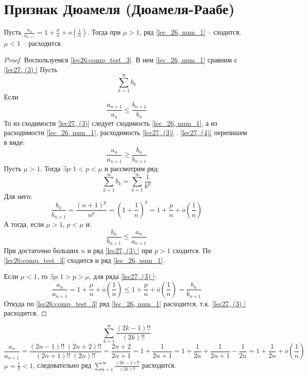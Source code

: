 \documentclass[../../main.tex]{subfiles}
\begin{document}
	\section{Признак Дюамеля (Дюамеля-Раабе)}
	
	\begin{thm}\label{lec27,duamele_raabe}
		Пусть $\frac{a_n}{a_{n+1}} = 1 + \frac{\mu}{n} + o\left( \frac{1}{n}\right) $. Тогда при $\mu > 1$, ряд \ref{lec_26, num_1} \--- сходится, $\mu < 1$ \--- расходится.
		\begin{proof}
			Воспользуемся \ref{lec26:comp_test_3}. В нем \ref{lec_26, num_1} сравним с \ref{lec27, (3) }
			Пусть \begin{equation} \label{lec27, (3) }
			\sum_{k = 1}^{\infty} b_k
			\end{equation}
			Если \begin{equation}\label{lec27, (4) }
			\frac{a_{n+1}}{a_n} \le \frac{b_{n+1}}{b_n}
			\end{equation}
			То из сходимости \ref{lec27, (3)} следует сходимость \ref{lec_26, num_1}, а из расходимости  \ref{lec_26, num_1}, расходимость \ref{lec27, (3)} . \ref{lec27, (4)} перепишем в виде:
			\begin{equation} \label{lec27,(5)}
			\frac{a_n}{a_{n+1}} \ge \frac{b_n}{b_{n+1}}
			\end{equation}
			Пусть $\mu > 1$. Тогда $\exists p :  1 < p < \mu$ и рассмотрим ряд:
			\[  \sum_{k=1}^{\infty} b_k = \sum_{k=1}^{\infty} \frac{1}{k^p}    \]
			Для него:
			\[ \frac{b_n}{b_{n+1}} = \frac{(n+1)^p}{n^p} = \left( 1 + \frac{1}{n} \right)^p = 1 + \frac{p}{n} + \overline{o}\left( \frac{1}{n} \right)       \]
			А тогда, если $\mu > 1$, $p < \mu$ и:
			\[ \frac{b_n}{b_{n+1}} \le \frac{a_n}{a_{n+1}}      \]
			При достаточно больших $n$ и ряд \ref{lec27, (3) } при $p > 1$ сходится. По \ref{lec26:comp_test_3} сходится и ряд \ref{lec_26, num_1}.
			
			Если $\mu < 1$, то $\exists p : 1 > p > \mu$, для ряда \ref{lec27, (3) }:
			\[  \frac{a_n}{a_{n+1}} = 1 + \frac{\mu}{n} + \overline{o}\left( \frac{1}{n} \right) \le  1 + \frac{p}{n} + \overline{o}\left( \frac{1}{n} \right) = \frac{b_n}{b_{n+1}}                   \]
			Откуда по \ref{lec26:comp_test_3} ряд \ref{lec_26, num_1} расходится, т.к. \ref{lec27, (3) } расходится.
		\end{proof}
	\end{thm}	
	
	
	\begin{example}
		\[ \sum_{k=1}^{\infty} \frac{(2k-1)!!}{(2k)!!}    \]
		\[ \frac{a_n}{a_{n+1}} = \frac{ (2n-1)!! \; (2n+2)!!}{ (2n+1)!! \;  (2n)!! } = \frac{2n+2}{2n+1} = 1 + \frac{1}{2n+1} = 1 + \frac{1}{2n} + \frac{1}{2n+1} - \frac{1}{2n} = 1 + \frac{1}{2n} + o\left( \frac{1}{n} \right)     \]
		$\mu = \frac{1}{2} < 1$, следовательно ряд $\sum_{k=1}^{\infty} \frac{(2k-1)!!}{(2k)!!}$ расходится.
		
	\end{example}	
\end{document}
